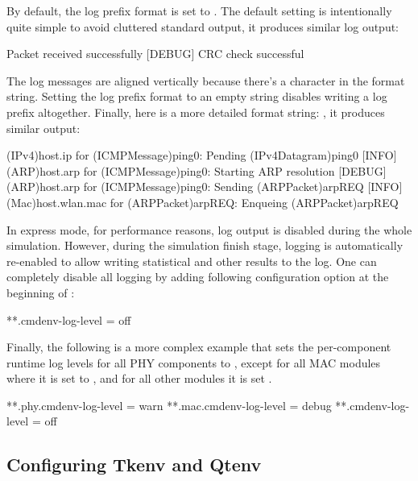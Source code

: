By default, the log prefix format is set to . The
default setting is intentionally quite simple to avoid cluttered standard output,
it produces similar log output:

\begin{filelisting}
[INFO]  Packet received successfully
[DEBUG] CRC check successful
\end{filelisting}

The log messages are aligned vertically because there's a  character
in the format string. Setting the log prefix format to an empty string disables
writing a log prefix altogether. Finally, here is a more detailed format string:
, it produces similar output:

\begin{filelisting}
[INFO]  (IPv4)host.ip for (ICMPMessage)ping0:     Pending (IPv4Datagram)ping0
[INFO]  (ARP)host.arp for (ICMPMessage)ping0:     Starting ARP resolution
[DEBUG] (ARP)host.arp for (ICMPMessage)ping0:     Sending (ARPPacket)arpREQ
[INFO]  (Mac)host.wlan.mac for (ARPPacket)arpREQ: Enqueing (ARPPacket)arpREQ
\end{filelisting}

In express mode, for performance reasons, log output is disabled during the whole
simulation. However, during the simulation finish stage, logging is automatically
re-enabled to allow writing statistical and other results to the log. One can
completely disable all logging by adding following configuration option at the
beginning of :

\begin{inifile}
[General]
**.cmdenv-log-level = off
\end{inifile}

Finally, the following is a more complex example that sets the per-component
runtime log levels for all PHY components to , except for
all MAC modules where it is set to , and for all other
modules it is set .

\begin{inifile}
[General]
**.phy.cmdenv-log-level = warn
**.mac.cmdenv-log-level = debug
**.cmdenv-log-level = off
\end{inifile}

\subsection{Configuring Tkenv and Qtenv}
\label{sec:config-sim:configuring-tkenv-and-qtenv}

